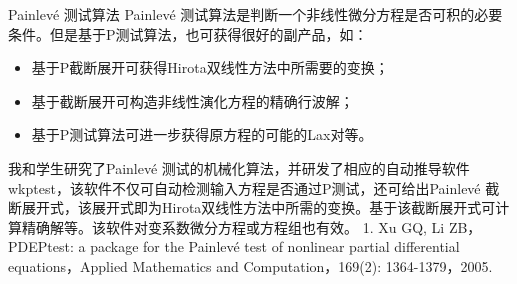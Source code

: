 \documentclass{beamer}
\begin{document}
\begin{frame}{Painlev\'e 测试算法}
Painlev\'e 测试算法是判断一个非线性微分方程是否可积的必要条件。但是基于P测试算法，也可获得很好的副产品，如：
\begin{itemize}
  \item 基于P截断展开可获得Hirota双线性方法中所需要的变换；
  \item 基于截断展开可构造非线性演化方程的精确行波解； 
  \item 基于P测试算法可进一步获得原方程的可能的Lax对等。
\end{itemize} 
我和学生研究了Painlev\'e 测试的机械化算法，并研发了相应的自动推导软件wkptest，该软件不仅可自动检测输入方程是否通过P测试，还可给出Painlev\'e 截断展开式，该展开式即为Hirota双线性方法中所需的变换。基于该截断展开式可计算精确解等。该软件对变系数微分方程或方程组也有效。
1. Xu GQ, Li ZB，PDEPtest: a package for the Painlevé test of nonlinear partial differential equations，Applied Mathematics and Computation，169(2): 1364-1379，2005.       
\end{frame}
\end{document}
